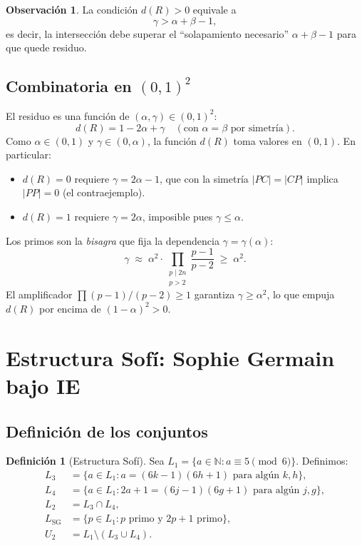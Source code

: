 \documentclass[11pt,a4paper]{article}
\theoremstyle{definition}
\newtheorem{definition}[theorem]{Definición}
\newtheorem{remark}[theorem]{Observación}
\newcommand{\NN}{\mathbb{N}}          %
\begin{document}
\begin{remark}
La condición $d(R)>0$ equivale a
\[
    \gamma > \alpha+\beta-1,
\]
es decir, la intersección debe superar el ``solapamiento necesario''
$\alpha+\beta-1$ para que quede residuo.
\end{remark}

\subsection{Combinatoria en $(0,1)^2$}

El residuo es una función de $(\alpha,\gamma)\in(0,1)^2$:
\[
    d(R) = 1-2\alpha+\gamma \quad (\text{con } \alpha=\beta \text{ por simetría}).
\]
Como $\alpha\in(0,1)$ y $\gamma\in(0,\alpha)$, la función $d(R)$ toma
valores en $(0,1)$.  En particular:

\begin{itemize}
    \item $d(R)=0$ requiere $\gamma=2\alpha-1$, que con la simetría $|PC|=|CP|$
          implica $|PP|=0$ (el contraejemplo).
    \item $d(R)=1$ requiere $\gamma=2\alpha$, imposible pues $\gamma\leq\alpha$.
\end{itemize}

Los primos son la \emph{bisagra} que fija la dependencia $\gamma=\gamma(\alpha)$:
\[
    \gamma \;\approx\; \alpha^2 \cdot \prod_{\substack{p\mid 2n\\p>2}}\frac{p-1}{p-2}
    \;\geq\; \alpha^2.
\]
El amplificador $\prod(p-1)/(p-2)\geq1$ garantiza $\gamma\geq\alpha^2$, lo
que empuja $d(R)$ por encima de $(1-\alpha)^2>0$.

\section{Estructura Sofí: Sophie Germain bajo IE}

\subsection{Definición de los conjuntos}

\begin{definition}[Estructura Sofí]\label{def:sofi}
Sea $L_1 = \{a\in\NN : a\equiv 5\pmod6\}$.  Definimos:
\begin{align*}
    L_3 &= \{a\in L_1 : a=(6k-1)(6h+1)\text{ para algún }k,h\},\\
    L_4 &= \{a\in L_1 : 2a+1=(6j-1)(6g+1)\text{ para algún }j,g\},\\
    L_2 &= L_3\cap L_4,\\
    L_{\mathrm{SG}} &= \{p\in L_1 : p\text{ primo y }2p+1\text{ primo}\},\\
    U_2  &= L_1\setminus(L_3\cup L_4).
\end{align*}
\end{definition}
\end{document}
